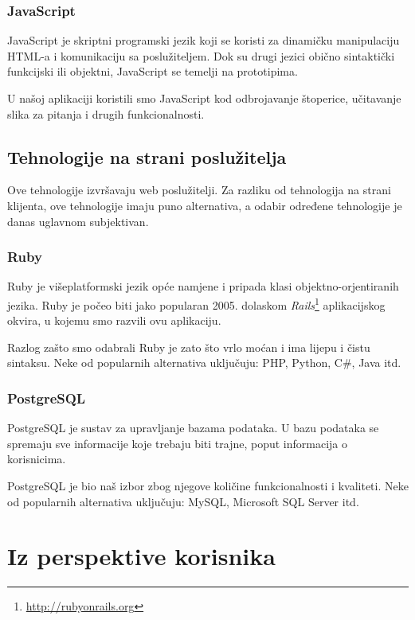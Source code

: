 \documentclass{scrreprt}
\begin{document}
\subsubsection{JavaScript}

JavaScript je skriptni programski jezik koji se koristi za dinamičku
manipulaciju HTML-a i komunikaciju sa poslužiteljem. Dok su drugi jezici obično
sintaktički funkcijski ili objektni, JavaScript se temelji na
prototipima.\cite{js}

U našoj aplikaciji koristili smo JavaScript kod odbrojavanje štoperice,
učitavanje slika za pitanja i drugih funkcionalnosti.

\subsection{Tehnologije na strani poslužitelja}

Ove tehnologije izvršavaju web poslužitelji. Za razliku od tehnologija na
strani klijenta, ove tehnologije imaju puno alternativa, a odabir određene
tehnologije je danas uglavnom subjektivan.

\subsubsection{Ruby}

Ruby je višeplatformski jezik opće namjene i pripada klasi objektno-orjentiranih
jezika. Ruby je počeo biti jako popularan 2005. dolaskom
\emph{Rails}\footnote{\url{http://rubyonrails.org}} aplikacijskog okvira, u
kojemu smo razvili ovu aplikaciju.\cite{ruby}

Razlog zašto smo odabrali Ruby je zato što vrlo moćan i ima lijepu i čistu
sintaksu. Neke od popularnih alternativa uključuju: PHP, Python, C\#, Java itd.

\subsubsection{PostgreSQL}

PostgreSQL je sustav za upravljanje bazama podataka. U bazu podataka se spremaju
sve informacije koje trebaju biti trajne, poput informacija o
korisnicima.\cite{postgresql}

PostgreSQL je bio naš izbor zbog njegove količine funkcionalnosti i kvaliteti.
Neke od popularnih alternativa uključuju: MySQL, Microsoft SQL Server itd.

\section{Iz perspektive korisnika}
\end{document}
